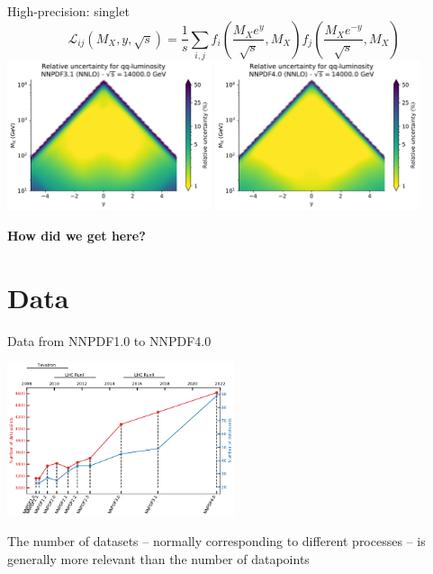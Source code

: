 \documentclass[aspectratio=169,9pt]{beamer}
\begin{document}
\begin{frame}[t]{High-precision: singlet }
	\begin{equation*}
	\mathcal{L}_{i j}\left(M_{X}, y, \sqrt{s}\right)
	=\frac{1}{s} \sum_{i, j} f_{i}\left(\frac{M_{X} e^{y}}{\sqrt{s}}, M_{X}\right) f_{j}\left(\frac{M_{X} e^{-y}}{\sqrt{s}}, M_{X}\right)
	\end{equation*}
	\includegraphics[width=0.45\textwidth]{plot_lumi2d_uncertainty_NNPDF31_qq}
	\includegraphics[width=0.45\textwidth]{plot_lumi2d_uncertainty_NNPDF40_qq}\\
	\begin{center}
	    \textbf{How did we get here?}
	\end{center}
\end{frame}






\section{Data}

\begin{frame}{Data from NNPDF1.0 to NNPDF4.0}
	\begin{center}
		\includegraphics[width=0.5\textwidth]{NNPDF_data_history.pdf}
	\end{center}
	The number of datasets -- normally corresponding to different processes -- is generally more relevant than the number of datapoints
\end{frame}
\end{document}
